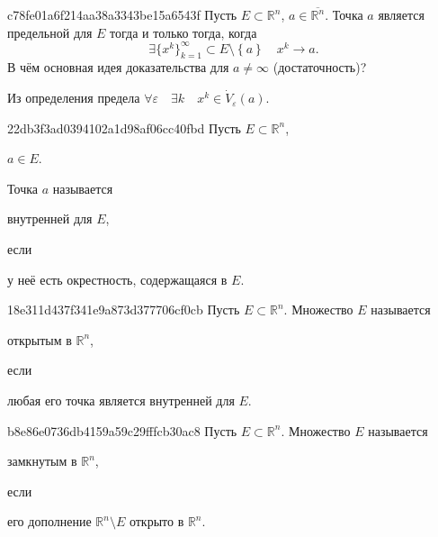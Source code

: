 \begin{note}{c78fe01a6f214aa38a3343be15a6543f}
    Пусть \({ E \subset \mathbb R^{n} }\),\: \({ a \in \overline{\mathbb R^{n}} }\). Точка \({ a }\) является предельной для \({ E }\) тогда и только тогда, когда
    \[
        \exists \{ x^{k} \}_{k = 1}^{\infty} \subset E \setminus \left\{ a \right\} \quad x^{k} \to a.
    \]
    В чём основная идея доказательства для \({ a \neq \infty }\) (достаточность)?

    \begin{cloze}{1}
        Из определения предела \({ \forall \varepsilon \quad \exists k \quad x^{k} \in \dot V_{\varepsilon}(a) }\).
    \end{cloze}
\end{note}

\begin{note}{22db3f3ad0394102a1d98af06cc40fbd}
    Пусть \({ E \subset \mathbb R^{n} }\),\: \begin{icloze}{3}\({ a \in E }\).\end{icloze}
    Точка \({ a }\) называется \begin{icloze}{2}внутренней для \({ E }\),\end{icloze} если \begin{icloze}{1}у неё есть окрестность, содержащаяся в \({ E }\).\end{icloze}
\end{note}

\begin{note}{18e311d437f341e9a873d377706cf0cb}
    Пусть \({ E \subset \mathbb R^{n} }\).
    Множество \({ E }\) называется \begin{icloze}{2}открытым в \({ \mathbb R^{n} }\),\end{icloze} если \begin{icloze}{1}любая его точка является внутренней для \({ E }\).\end{icloze}
\end{note}

\begin{note}{b8e86e0736db4159a59c29fffcb30ac8}
    Пусть \({ E \subset \mathbb R^{n} }\).
    Множество \({ E }\) называется \begin{icloze}{2}замкнутым в \({ \mathbb R^{n} }\),\end{icloze} если \begin{icloze}{1}его дополнение \({ \mathbb R^{n} \setminus E }\) открыто в \({ \mathbb R^{n} }\).\end{icloze}
\end{note}

